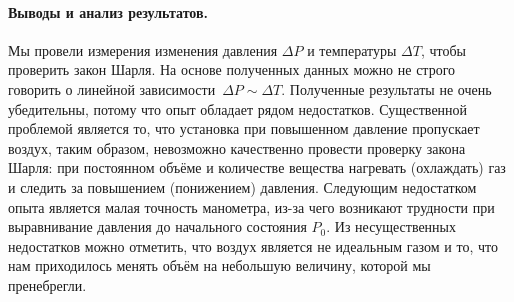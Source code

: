 \documentclass{article}
\begin{document}
\paragraph{Выводы и анализ результатов.}
Мы провели измерения изменения давления $\Delta P$ и температуры $\Delta T$, чтобы проверить закон Шарля. На основе полученных данных можно не строго говорить о линейной зависимости~$\Delta P \sim \Delta T$. Полученные результаты не очень убедительны, потому что опыт обладает рядом недостатков. Существенной проблемой является то, что установка при повышенном давление пропускает воздух, таким образом, невозможно качественно провести проверку закона Шарля: при постоянном объёме и количестве вещества нагревать (охлаждать) газ и следить за повышением (понижением) давления. Следующим недостатком опыта является малая точность манометра, из-за чего возникают трудности при выравнивание давления до начального состояния $P_0$. Из несущественных недостатков можно отметить, что воздух является не идеальным газом и то, что нам приходилось менять объём на небольшую величину, которой мы пренебрегли.
\end{document}

